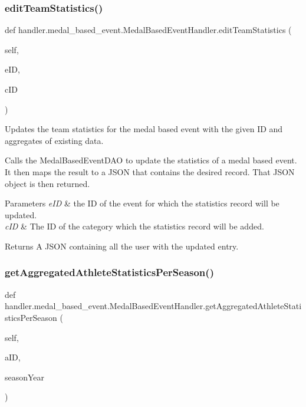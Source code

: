 \subsubsection{\texorpdfstring{edit\+Team\+Statistics()}{editTeamStatistics()}}
{\footnotesize\ttfamily def handler.\+medal\+\_\+based\+\_\+event.\+Medal\+Based\+Event\+Handler.\+edit\+Team\+Statistics (\begin{DoxyParamCaption}\item[{}]{self,  }\item[{}]{e\+ID,  }\item[{}]{c\+ID }\end{DoxyParamCaption})}



Updates the team statistics for the medal based event with the given ID and aggregates of existing data. 

Calls the Medal\+Based\+Event\+D\+AO to update the statistics of a medal based event. It then maps the result to a J\+S\+ON that contains the desired record. That J\+S\+ON object is then returned.


\begin{DoxyParams}{Parameters}
{\em e\+ID} & the ID of the event for which the statistics record will be updated. \\
\hline
{\em c\+ID} & The ID of the category which the statistics record will be added.\\
\hline
\end{DoxyParams}
\begin{DoxyReturn}{Returns}
A J\+S\+ON containing all the user with the updated entry. 
\end{DoxyReturn}
\mbox{\label{classhandler_1_1medal__based__event_1_1_medal_based_event_handler_aec588df72bb9e9caa0ff1f84348be2e5}} 
\subsubsection{\texorpdfstring{get\+Aggregated\+Athlete\+Statistics\+Per\+Season()}{getAggregatedAthleteStatisticsPerSeason()}}
{\footnotesize\ttfamily def handler.\+medal\+\_\+based\+\_\+event.\+Medal\+Based\+Event\+Handler.\+get\+Aggregated\+Athlete\+Statistics\+Per\+Season (\begin{DoxyParamCaption}\item[{}]{self,  }\item[{}]{a\+ID,  }\item[{}]{season\+Year }\end{DoxyParamCaption})}



